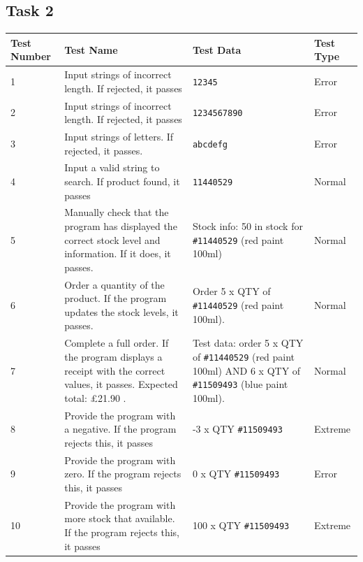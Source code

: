 \documentclass[a4paper]{article}
\begin{document}
\subsection{Task 2}
\begin{center}
\begin{tabular}{ | m{4em} | m{19em} | m{12em} | m{5em} | }
  \hline
  Test Number & Test Name & Test Data & Test Type	\\ [0.5ex] 
  \hline\hline
  1 & Input strings of incorrect length. If rejected, it passes & \verb|12345| & Error \\
  \hline
  2 & Input strings of incorrect length. If rejected, it passes & \verb|1234567890| & Error \\
  \hline
  3 & Input strings of letters. If rejected, it passes. & \verb|abcdefg| & Error \\
  \hline
  4 & Input a valid string to search. If product found, it passes & \verb|11440529| & Normal \\
  \hline
  5 & Manually check that the program has displayed the correct stock level and information. If it does, it passes. & Stock info: 50 in stock for \verb|#11440529| (red paint 100ml) & Normal \\
  \hline
  6 & Order a quantity of the product. If the program updates the stock levels, it passes. & Order 5 x QTY of \verb|#11440529| (red paint 100ml). & Normal \\
  \hline
  7 & Complete a full order. If the program displays a receipt with the correct values, it passes. Expected total: \pounds21.90 . & Test data: order 5 x QTY of \verb|#11440529| (red paint 100ml) AND 6 x QTY of \verb|#11509493| (blue paint 100ml). & Normal \\
  \hline
  8 & Provide the program with a negative. If the program rejects this, it passes & -3 x QTY \verb|#11509493| & Extreme \\
  \hline
	9 & Provide the program with zero. If the program rejects this, it passes & 0 x QTY \verb|#11509493| & Error \\
	\hline
	10 & Provide the program with more stock that available. If the program rejects this, it passes & 100 x QTY \verb|#11509493| & Extreme \\
	\hline
\end{tabular}
\end{center}
\end{document}

